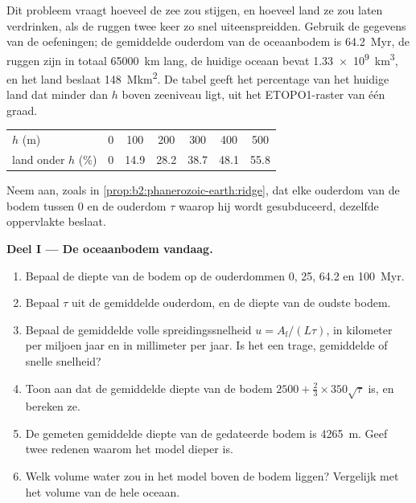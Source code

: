 \begin{problem}\label{pb:b2:phanerozoic-earth:1}
Dit probleem vraagt hoeveel de zee zou stijgen, en hoeveel land ze zou laten verdrinken, als de
ruggen twee keer zo snel uiteenspreidden. Gebruik de gegevens van de oefeningen; de gemiddelde ouderdom van de oceaanbodem is
\qty{64.2}{Myr}, de ruggen zijn in totaal \qty{65000}{km} lang, de huidige oceaan bevat
\qty{1.33e9}{km^3}, en het land beslaat \qty{148}{\mega km^2}. De tabel geeft het percentage van het
huidige land dat minder dan $h$ boven zeeniveau ligt, uit het ETOPO1-raster van één graad.
\begin{center}
\small
\begin{tabular}{lcccccc}
\hline
$h$ (\unit{m}) & 0 & 100 & 200 & 300 & 400 & 500 \\
land onder $h$ (\unit{\percent}) & 0 & 14.9 & 28.2 & 38.7 & 48.1 & 55.8 \\
\hline
\end{tabular}
\end{center}
Neem aan, zoals in \cref{prop:b2:phanerozoic-earth:ridge}, dat elke ouderdom van de bodem tussen 0 en de
ouderdom $\tau$ waarop hij wordt gesubduceerd, dezelfde oppervlakte beslaat.

\noindent\textbf{Deel I --- De oceaanbodem vandaag.}
\begin{enumerate}
  \item Bepaal de diepte van de bodem op de ouderdommen 0, 25, 64.2 en \qty{100}{Myr}.
  \item Bepaal $\tau$ uit de gemiddelde ouderdom, en de diepte van de oudste bodem.
  \item Bepaal de gemiddelde volle spreidingssnelheid $u = A_{\text{f}}/(L\tau)$, in kilometer per miljoen
        jaar en in millimeter per jaar. Is het een trage, gemiddelde of snelle snelheid?
  \item Toon aan dat de gemiddelde diepte van de bodem $2500 + \tfrac23 \times 350\sqrt\tau$ is, en
        bereken ze.
  \item De gemeten gemiddelde diepte van de gedateerde bodem is \qty{4265}{m}. Geef twee redenen waarom het
        model dieper is.
  \item Welk volume water zou in het model boven de bodem liggen? Vergelijk met het volume van
        de hele oceaan.
\end{enumerate}


\end{problem}
